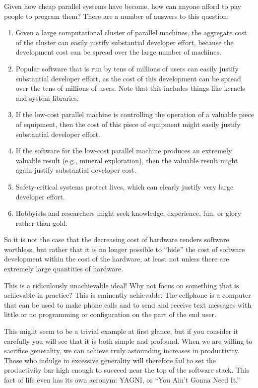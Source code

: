 \QuickQ{}
	Given how cheap parallel systems have become, how can anyone
	afford to pay people to program them?
\QuickA{}
	There are a number of answers to this question:
	\begin{enumerate}
	\item	Given a large computational cluster of parallel machines,
		the aggregate cost of the cluster can easily justify
		substantial developer effort, because the development
		cost can be spread over the large number of machines.
	\item	Popular software that is run by tens of millions of users
		can easily justify substantial developer effort,
		as the cost of this development can be spread over the tens
		of millions of users.
		Note that this includes things like kernels and system
		libraries.
	\item	If the low-cost parallel machine is controlling the operation
		of a valuable piece of equipment, then the cost of this
		piece of equipment might easily justify substantial
		developer effort.
	\item	If the software for the low-cost parallel machine produces an
		extremely valuable result (e.g., mineral exploration),
		then the valuable result might again justify substantial
		developer cost.
	\item	Safety-critical systems protect lives, which can clearly
		justify very large developer effort.
	\item	Hobbyists and researchers might seek knowledge, experience,
		fun, or glory rather than gold.
	\end{enumerate}
	So it is not the case that the decreasing cost of hardware renders
	software worthless, but rather that it is no longer possible to
	``hide'' the cost of software development within the cost of
	the hardware, at least not unless there are extremely large
	quantities of hardware.

\QuickQ{}
	This is a ridiculously unachievable ideal!
	Why not focus on something that is achievable in practice?
\QuickA{}
	This is eminently achievable.
	The cellphone is a computer that can be used to make phone
	calls and to send and receive text messages with little or
	no programming or configuration on the part of the end user.

	This might seem to be a trivial example at first glance,
	but if you consider it carefully you will see that it is
	both simple and profound.
	When we are willing to sacrifice generality, we can achieve
	truly astounding increases in productivity.
	Those who indulge in excessive generality will therefore fail to set
	the productivity bar high enough to succeed near the top of the
	software stack.
	This fact of life even has its own acronym: YAGNI, or ``You
	Ain't Gonna Need It.''

